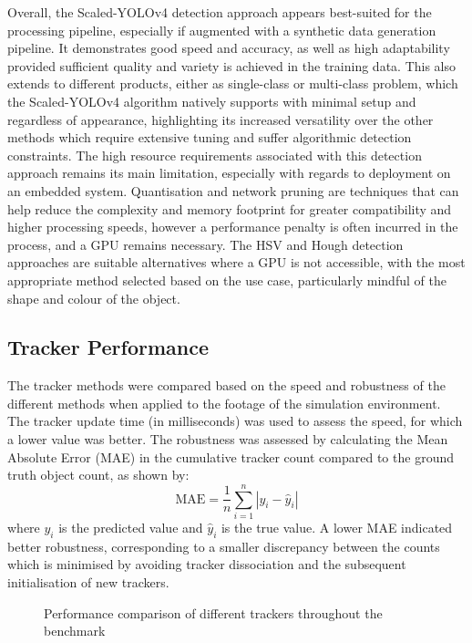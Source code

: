 \documentclass[10pt]{article}
\begin{document}
Overall, the Scaled-YOLOv4 detection approach appears best-suited for the processing pipeline, especially if augmented with a synthetic data generation pipeline. It demonstrates good speed and accuracy, as well as high adaptability provided sufficient quality and variety is achieved in the training data. This also extends to different products, either as single-class or multi-class problem, which the Scaled-YOLOv4 algorithm natively supports with minimal setup and regardless of appearance, highlighting its increased versatility over the other methods which require extensive tuning and suffer algorithmic detection constraints. The high resource requirements associated with this detection approach remains its main limitation, especially with regards to deployment on an embedded system. Quantisation and network pruning are techniques that can help reduce the complexity and memory footprint for greater compatibility and higher processing speeds, however a performance penalty is often incurred in the process, and a GPU remains necessary. The HSV and Hough detection approaches are suitable alternatives where a GPU is not accessible, with the most appropriate method selected based on the use case, particularly mindful of the shape and colour of the object.

\subsection{Tracker Performance}
The tracker methods were compared based on the speed and robustness of the different methods when applied to the footage of the simulation environment. The tracker update time (in milliseconds) was used to assess the speed, for which a lower value was better. The robustness was assessed by calculating the Mean Absolute Error (MAE) in the cumulative tracker count compared to the ground truth object count, as shown by:
\begin{equation}
    \text{MAE} = \frac{1}{n}\sum_{i=1}^{n}|y_i-\hat{y}_i|
    \label{eqn:mse}
\end{equation}
where $y_i$ is the predicted value and $\hat{y}_i$ is the true value. A lower MAE indicated better robustness, corresponding to a smaller discrepancy between the counts which is minimised by avoiding tracker dissociation and the subsequent initialisation of new trackers.

\vspace{-0.3cm}

\begin{figure}[h]%
    \centering
    \qquad %
    \caption{Performance comparison of different trackers throughout the benchmark}
    \label{fig:tracker_plots}%
\end{figure}
\end{document}

